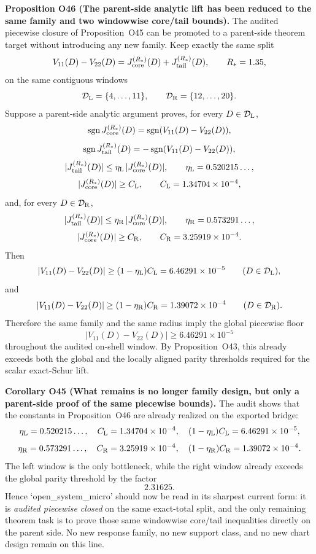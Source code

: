 \documentclass[aps,prd,onecolumn,notitlepage,nofootinbib,superscriptaddress,11pt,floatfix]{revtex4-2}
\begin{document}
\medskip\noindent\textbf{Proposition O46 (The parent-side analytic lift has been reduced to the same family and two windowwise core/tail bounds).}
The audited piecewise closure of Proposition~O45 can be promoted to a parent-side theorem target without introducing any new family.  Keep exactly the same split
\[
V_{11}(D)-V_{22}(D)=J_{\rm core}^{(R_\ast)}(D)+J_{\rm tail}^{(R_\ast)}(D),
\qquad
R_\ast=1.35,
\]
on the same contiguous windows
\[
\mathcal D_{\rm L}=\{4,\dots,11\},
\qquad
\mathcal D_{\rm R}=\{12,\dots,20\}.
\]
Suppose a parent-side analytic argument proves, for every \(D\in\mathcal D_{\rm L}\),
\[
\operatorname{sgn}J_{\rm core}^{(R_\ast)}(D)
=
\operatorname{sgn}(V_{11}(D)-V_{22}(D)),
\]
\[
\operatorname{sgn}J_{\rm tail}^{(R_\ast)}(D)
=
-\operatorname{sgn}(V_{11}(D)-V_{22}(D)),
\]
\[
|J_{\rm tail}^{(R_\ast)}(D)|
\le
\eta_{\rm L}\,|J_{\rm core}^{(R_\ast)}(D)|,
\qquad
\eta_{\rm L}=0.520215\ldots,
\]
\[
|J_{\rm core}^{(R_\ast)}(D)|
\ge
C_{\rm L},
\qquad
C_{\rm L}=1.34704\times10^{-4},
\]
and, for every \(D\in\mathcal D_{\rm R}\),
\[
|J_{\rm tail}^{(R_\ast)}(D)|
\le
\eta_{\rm R}\,|J_{\rm core}^{(R_\ast)}(D)|,
\qquad
\eta_{\rm R}=0.573291\ldots,
\]
\[
|J_{\rm core}^{(R_\ast)}(D)|
\ge
C_{\rm R},
\qquad
C_{\rm R}=3.25919\times10^{-4}.
\]
Then
\[
|V_{11}(D)-V_{22}(D)|
\ge
(1-\eta_{\rm L})C_{\rm L}
=
6.46291\times10^{-5}
\qquad
(D\in\mathcal D_{\rm L}),
\]
and
\[
|V_{11}(D)-V_{22}(D)|
\ge
(1-\eta_{\rm R})C_{\rm R}
=
1.39072\times10^{-4}
\qquad
(D\in\mathcal D_{\rm R}).
\]
Therefore the same family and the same radius imply the global piecewise floor
\[
|V_{11}(D)-V_{22}(D)|\ge 6.46291\times10^{-5}
\]
throughout the audited on-shell window.  By Proposition~O43, this already exceeds both the global and the locally aligned parity thresholds required for the scalar exact-Schur lift.

\medskip\noindent\textbf{Corollary O45 (What remains is no longer family design, but only a parent-side proof of the same piecewise bounds).}
The audit
shows that the constants in Proposition~O46 are already realized on the exported bridge:
\[
\eta_{\rm L}=0.520215\ldots,\quad
C_{\rm L}=1.34704\times10^{-4},\quad
(1-\eta_{\rm L})C_{\rm L}=6.46291\times10^{-5},
\]
\[
\eta_{\rm R}=0.573291\ldots,\quad
C_{\rm R}=3.25919\times10^{-4},\quad
(1-\eta_{\rm R})C_{\rm R}=1.39072\times10^{-4}.
\]
The left window is the only bottleneck, while the right window already exceeds the global parity threshold by the factor
\[
2.31625.
\]
Hence `open\_system\_micro' should now be read in its sharpest current form: it is \emph{audited piecewise closed} on the same exact-total split, and the only remaining theorem task is to prove those same windowwise core/tail inequalities directly on the parent side.  No new response family, no new support class, and no new chart design remain on this line.
\end{document}
